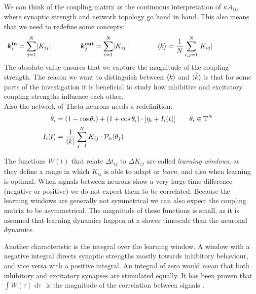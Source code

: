 We can think of the coupling matrix as the continuous interpretation of $\kappa A_{ij}$, where synaptic strength and network topology go hand in hand. This also means that we need to redefine some concepts:
\begin{align}
\kinbi = \sum_{j=1}^{N} \rvert K_{i j} \rvert \hspace{15mm} 
\koutbj = \sum_{i=1}^{N} \rvert K_{i j} \rvert \hspace{15mm} 
\kmean &= \frac{1}{N} \sum_{i,j=1}^{N} \rvert K_{i j} \rvert \hspace{15mm}  \label{eq:redefineFromK}  %
\end{align}
The absolute value ensures that we capture the magnitude of the coupling strength. The reason we want to distinguish between ${\langle k\rangle}$ and $\hat{{\langle k\rangle}}$ is that for some parts of the investigation it is beneficial to study how inhibitive and excitatory coupling strengths influence each other.\\

Also the network of Theta neurons needs a redefinition:
\begin{align}
\dot{\theta}_{i} &=\left(1-\cos \theta_{i}\right)+\left(1+\cos \theta_{i}\right) \cdot \left[\eta_{i} + I_{i}(t)\right] \qquad \theta_i \in \T^N  \label{eq:thetaneuronnetwork_adaptive} \\
I_{i}(t) &=\frac{1}{\kmean} \sum_{j=1}^{N} K_{i j} \cdot \mathcal{P}_{n}(\theta_{j}) \label{eq:thetaneuronnetworkcurrent_adaptive}
\end{align}


The functions $W(t)$ that relate $\Delta t_{ij}$ to $\Delta K_{ij}$ are called \textsl{learning windows},  as they define a range in which $K_{ij}$ is able to adapt or \textsl{learn}, and also when learning is optimal. When signals between neurons show a very large time difference (negative or positive) we do not expect them to be correlated. Because the learning windows are generally not symmetrical we can also expect the coupling matrix to be asymmetrical. The magnitude of these functions is small, as it is assumed that learning dynamics happen at a slower timescale than the neuronal dynamics.

Another characteristic is the integral over the learning window. A window with a negative integral directs synaptic strengths mostly towards inhibitory behaviour, and vice versa with a positive integral. An integral of zero would mean that both inhibitory and excitatory synapses are stimulated equally. It has been proven that $\int W(\tau) \mathop{d\tau}$ is the magnitude of the correlation between signals \cite{Gerstner2002}. \\

